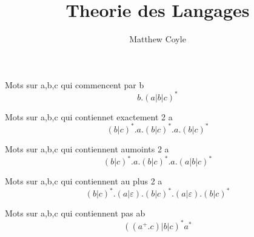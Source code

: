 \documentclass{article}
\author{Matthew Coyle}
\title{Theorie des Langages}
\begin{document}
Mots sur {a,b,c} qui commencent par b
$$b.(a|b|c)^*$$

Mots sur {a,b,c} qui contiennet exactement 2 a
$$(b|c)^*.a.(b|c)^*.a.(b|c)^*$$

Mots sur {a,b,c} qui contiennent aumoints 2 a
$$(b|c)^*.a.(b|c)^*.a.(a|b|c)^*$$

Mots sur {a,b,c} qui contiennent au plus 2 a
$$(b|c)^*.(a|\varepsilon).(b|c)^*.(a|\varepsilon).(b|c)^*$$

Mots sur {a,b,c} qui contiennent pas ab
$$((a^+.c)|b|c)^*a^*$$
\end{document}
